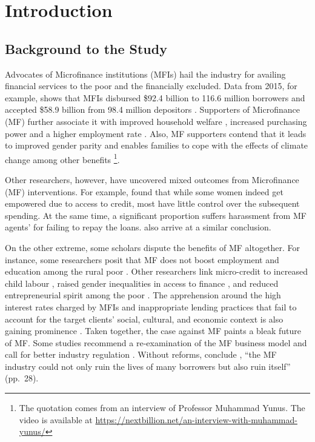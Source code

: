 \documentclass[a4paper, nobind]{templates/ociamthesis}
\begin{document}
\hypertarget{Introduction}{%
\chapter{Introduction}\label{Introduction}}

\minitoc 

\hypertarget{background-to-the-study}{%
\section{Background to the Study}\label{background-to-the-study}}

\noindent Advocates of Microfinance institutions (MFIs) hail the industry for availing financial services to the poor and the financially excluded. Data from 2015, for example, shows that MFIs disbursed \$92.4 billion to 116.6 million borrowers and accepted \$58.9 billion from 98.4 million depositors \autocite{market2014global}. Supporters of Microfinance (MF) further associate it with improved household welfare \autocite{meador2017food,you2013role}, increased purchasing power and a higher employment rate \autocite{raihan2017macro,lopatta2016microfinance}. Also, MF supporters contend that it leads to improved gender parity \autocite{mafukata2017reciprocal,zhang2017microfinance} and enables families to cope with the effects of climate change \autocite{fenton2017role} among other benefits \footnote{The quotation comes from an interview of Professor Muhammad Yunus. The video is available at \url{https://nextbillion.net/an-interview-with-muhammad-yunus/}}.

Other researchers, however, have uncovered mixed outcomes from Microfinance (MF) interventions. For example, \textcite{ganle2015microcredit} found that while some women indeed get empowered due to access to credit, most have little control over the subsequent spending. At the same time, a significant proportion suffers harassment from MF agents' for failing to repay the loans. \textcite{van2012impact} also arrive at a similar conclusion.

On the other extreme, some scholars dispute the benefits of MF altogether. For instance, some researchers posit that MF does not boost employment and education among the rural poor \autocite{bauchet2013micro}. Other researchers link micro-credit to increased child labour \autocite{hazarika2008household}, raised gender inequalities in access to finance \autocite{zulfiqar2017does}, and reduced entrepreneurial spirit among the poor \autocite{field2013does}. The apprehension around the high interest rates charged by MFIs and inappropriate lending practices that fail to account for the target clients' social, cultural, and economic context is also gaining prominence \autocite{chester2016one}. Taken together, the case against MF paints a bleak future of MF. Some studies recommend a re-examination of the MF business model and call for better industry regulation \autocite{johnson2013microfinance,ghosh2013microfinance}. Without reforms, conclude \textcite{chester2016one}, ``the MF industry could not only ruin the lives of many borrowers but also ruin itself'' (pp.~28).
\end{document}
